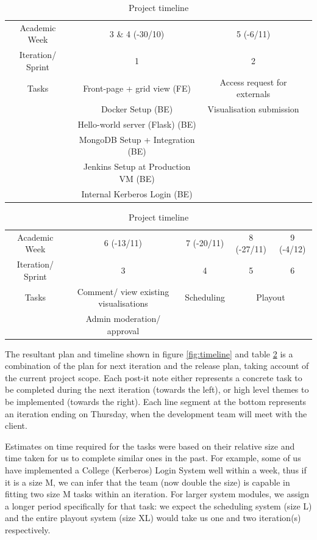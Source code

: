 \documentclass[a4paper]{article}
\begin{document}
\begin{table}[h]
  \begin{tabular}{c | c | c | c }
    Academic Week & 3 \& 4 (-30/10) & 5 (-6/11) \\
    Iteration/ Sprint & 1 & 2 \\ \hline
    Tasks & Front-page + grid view (FE) & Access request for externals \\
          & Docker Setup (BE)           & Visualisation submission \\
          & Hello-world server (Flask) (BE) & \\
          & MongoDB Setup + Integration (BE) & \\
          & Jenkins Setup at Production VM (BE) & \\
          & Internal Kerberos Login (BE) & \\
  \end{tabular}

  \vspace{10pt}
  \begin{tabular}{c | c | c | c | c}
    Academic Week & 6 (-13/11) & 7 (-20/11) & 8 (-27/11) & 9 (-4/12) \\
    Iteration/ Sprint & 3 & 4 & 5 & 6 \\ \hline
    Tasks & Comment/ view existing visualisations & Scheduling & 
            \multicolumn{2}{c}{Playout} \\
          & Admin moderation/ approval &  \\
  \end{tabular}
  \caption{Project timeline}
  \label{table:timeline}
\end{table}

The resultant plan and timeline shown in figure \ref{fig:timeline} and table
\ref{table:timeline} is a
combination of the plan for next iteration and the release plan, taking account
of the current project scope. Each post-it note either represents a 
concrete task to be completed during the next iteration (towards the left), or
high level themes to be implemented (towards the right). Each line segment at
the bottom represents an iteration ending on Thursday, when the development
team will meet with the client.

Estimates on time required for the tasks were based on their relative size and
time taken for us to complete similar ones in the past. For example, some of us
have implemented a College (Kerberos) Login System well within a week, thus if
it is a size M, we can infer that the team (now double the size) is capable in 
fitting two size M tasks within an iteration. For larger system modules, we
assign a longer period specifically for that task: we expect the scheduling
system (size L) and the entire playout system (size XL) would take us one and
two iteration(s) respectively.
\end{document}

